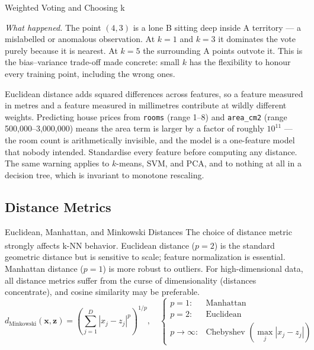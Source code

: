 \begin{v3topic}{Weighted Voting and Choosing k}
\begin{workedexample}
\emph{What happened.} The point $(4,3)$ is a lone B sitting deep inside A
territory --- a mislabelled or anomalous observation. At $k=1$ and $k=3$ it
dominates the vote purely because it is nearest. At $k=5$ the surrounding A
points outvote it. This is the bias--variance trade-off made concrete: small
$k$ has the flexibility to honour every training point, including the wrong
ones.
\end{workedexample}

\begin{cautionbox}
Euclidean distance adds squared differences across features, so a feature
measured in metres and a feature measured in millimetres contribute at wildly
different weights. Predicting house prices from \texttt{rooms} (range 1--8) and
\texttt{area\_cm2} (range 500{,}000--3{,}000{,}000) means the area term is
larger by a factor of roughly $10^{11}$ --- the room count is arithmetically
invisible, and the model is a one-feature model that nobody intended.
Standardise every feature before computing any distance. The same warning
applies to $k$-means, SVM, and PCA, and to nothing at all in a decision tree,
which is invariant to monotone rescaling.
\end{cautionbox}
\end{v3topic}

\subsection{Distance Metrics}

\begin{v3topic}{Euclidean, Manhattan, and Minkowski Distances}
    The choice of distance metric strongly affects k-NN behavior\textsuperscript{\cite[][p.397]{hanDataMiningConcepts2012}}. Euclidean distance ($p=2$) is the standard geometric distance but is sensitive to scale; feature normalization is essential. Manhattan distance ($p=1$) is more robust to outliers. For high-dimensional data, all distance metrics suffer from the curse of dimensionality (distances concentrate), and cosine similarity may be preferable.
\visualseparator
    \begin{equation}
        d_{\text{Minkowski}}(\mathbf{x}, \mathbf{z}) = \left(\sum_{j=1}^{D} |x_j - z_j|^p\right)^{1/p},
        \quad
        \begin{cases}
            p = 1: & \text{Manhattan} \\
            p = 2: & \text{Euclidean} \\
            p \to \infty: & \text{Chebyshev } (\max_j |x_j - z_j|)
        \end{cases}
    \end{equation}
\end{v3topic}

